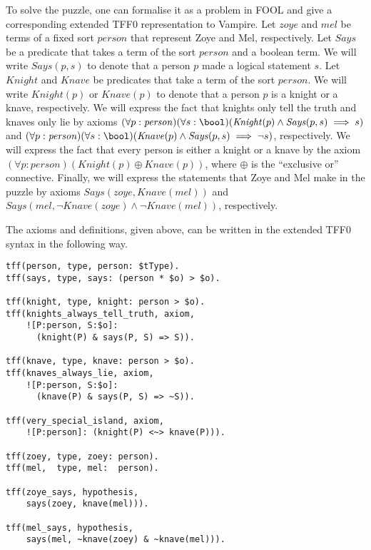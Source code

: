 \newcommand{\knight}{\mathit{Knight}}
\newcommand{\knave}{\mathit{Knave}}
\newcommand{\says}{\mathit{Says}}
\newcommand{\statement}{\mathit{statement}}
\newcommand{\person}{\mathit{person}}
\newcommand{\zoye}{\mathit{zoye}}
\newcommand{\mel}{\mathit{mel}}
To solve the puzzle, one can formalise it as a problem in FOOL and give a corresponding extended TFF0 representation to Vampire. Let $\zoye$ and $\mel$ be terms of a fixed sort $\person$ that represent Zoye and Mel, respectively. Let $\says$ be a predicate that takes a term of the sort $\person$ and a boolean term. We will write $\says(p, s)$ to denote that a person $p$ made a logical statement $s$. Let $\knight$ and $\knave$ be predicates that take a term of the sort $\person$. We will write $\knight(p)$ or $\knave(p)$ to denote that a person $p$ is a knight or a knave, respectively. We will express the fact that knights only tell the truth and knaves only lie by axioms $(\forall p:\person)(\forall s:\bool)(\knight(p) \land \says(p, s) \implies s)$ and $(\forall p:\person)(\forall s:\bool)(\knave(p) \land \says(p, s) \implies \neg s)$, respectively. We will express the fact that every person is either a knight or a knave by the axiom $(\forall p:\person)(\knight(p) \oplus \knave(p))$, where $\oplus$ is the ``exclusive or'' connective. Finally, we will express the statements that Zoye and Mel make in the puzzle by axioms $\says(\zoye, \knave(\mel))$ and $\says(\mel, \neg\knave(\zoye) \land \neg\knave(\mel))$, respectively.

The axioms and definitions, given above, can be written in the extended TFF0 syntax in the following way.
\begin{lstlisting}
tff(person, type, person: $tType).
tff(says, type, says: (person * $o) > $o).

tff(knight, type, knight: person > $o).
tff(knights_always_tell_truth, axiom,
    ![P:person, S:$o]:
      (knight(P) & says(P, S) => S)).

tff(knave, type, knave: person > $o).
tff(knaves_always_lie, axiom,
    ![P:person, S:$o]:
      (knave(P) & says(P, S) => ~S)).

tff(very_special_island, axiom,
    ![P:person]: (knight(P) <~> knave(P))).

tff(zoey, type, zoey: person).
tff(mel,  type, mel:  person).

tff(zoye_says, hypothesis,
    says(zoey, knave(mel))).

tff(mel_says, hypothesis,
    says(mel, ~knave(zoey) & ~knave(mel))).
\end{lstlisting}

